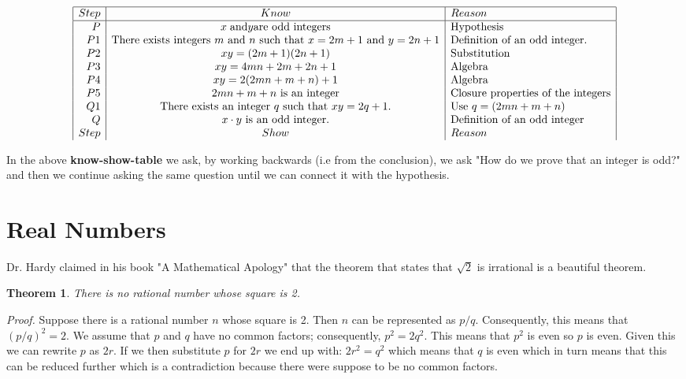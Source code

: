 \documentclass[10pt]{article}
\newtheorem{theorem}{Theorem}
\begin{document}
\begin{center}
    \[
\begin{array}{|r|c|l|} \hline
Step & Know & Reason\\
\hline
P & x\hspace{.1cm} \text{and} y \text{are odd integers} & \text{Hypothesis}\\
P1 & \text{There exists integers $m$ and $n$ such that $x = 2m + 1$ and $y = 2n + 1$}  & \text{Definition of an odd integer.} \\
P2 & xy = (2m + 1)(2n + 1) & \text{Substitution}\\
P3 & xy = 4mn + 2m + 2n + 1 & \text{Algebra} \\
P4 & xy = 2(2mn + m + n) + 1 & \text{Algebra}\\
P5 & \text{$2mn + m + n$ is an integer} & \text{Closure properties of the integers}\\
Q1 & \text{There exists an integer $q$ such that $xy = 2q + 1.$}  & \text{Use $q = (2mn + m + n)$}\\
Q & \text{$ x \cdot y$ is an odd integer.} & \text{Definition of an odd integer}\\
Step & Show & Reason
\end{array}
\]
\end{center}

In the above \textbf{know-show-table} we ask, by working backwards (i.e from the conclusion), we ask "How do we prove that an integer is odd?" and then we continue asking the same question until we can connect it with the hypothesis.




\section{Real Numbers}

 Dr. Hardy claimed in his book "A Mathematical Apology" that the theorem that states that $\sqrt{2}$ is irrational is a beautiful theorem.

\begin{theorem}
There is no rational number whose square is 2.
\end{theorem}
\textit{Proof.} Suppose there is a rational number $n$ whose square is 2. Then $n$ can be represented as $p/q$. Consequently, this means that $(p/q)^2 = 2$. We assume that $p$ and $q$ have no common factors; consequently, $p^2 = 2q^2$. This means that  $p^2$ is even so $p$ is even. Given this we can rewrite $p$ as $2r$. If we then substitute $p$ for $2r$ we end up with: $2r^2 = q^2$ which means that $q$ is even which in turn means that this can be reduced further which is a contradiction because there were suppose to be no common factors.
\end{document}
